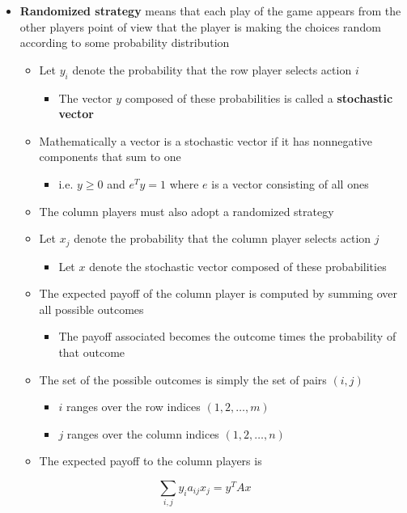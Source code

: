 \documentclass[11pt]{article}
\begin{document}
\begin{itemize}
\item \textbf{Randomized strategy} means that each play of the game appears from the other players point of view that the player is making the choices random according to some probability distribution
\begin{itemize}
\item Let \(y_i\) denote the probability that the row player selects action \(i\)
\begin{itemize}
\item The vector \(y\) composed of these probabilities is called a \textbf{stochastic vector}
\end{itemize}
\item Mathematically a vector is a stochastic vector if it has nonnegative components that sum to one
\begin{itemize}
\item i.e. \(y \geq 0\)  and \(e^T y = 1\) where \(e\) is a vector consisting of all ones
\end{itemize}
\item The column players must also adopt a randomized strategy
\item Let \(x_j\) denote the probability that the column player selects action \(j\)
\begin{itemize}
\item Let \(x\) denote the stochastic vector composed of these probabilities
\end{itemize}
\item The expected payoff of the column player is computed by summing over all possible outcomes
\begin{itemize}
\item The payoff associated becomes the outcome times the probability of that outcome
\end{itemize}
\item The set of the possible outcomes is simply the set of pairs \((i,j)\)
\begin{itemize}
\item \(i\) ranges over the row indices \((1,2,\dots,m)\)
\item \(j\) ranges over the column indices \((1,2,\dots,n)\)
\end{itemize}
\item The expected payoff to the column players is
\end{itemize}
\end{itemize}
\begin{equation*}
  \sum_{i,j} y_ia_{ij}x_j = y^T A x
\end{equation*}
\end{document}

